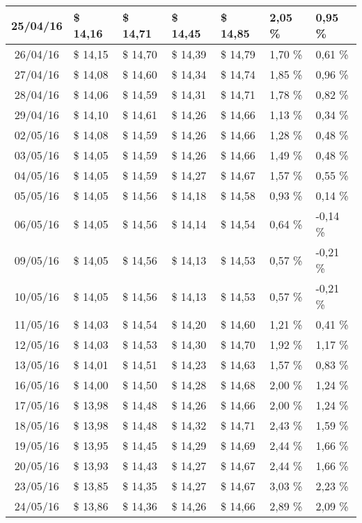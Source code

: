 \begin{center}
\begin{longtable}{|c|p{1.5cm}|p{1.5cm}|p{1.5cm}|p{1.5cm}|p{1.5cm}|p{1.5cm}|}
25/04/16 & \$ 14,16 & \$ 14,71 & \$ 14,45 & \$ 14,85 & 2,05 \% & 0,95 \% \\ \hline
26/04/16 & \$ 14,15 & \$ 14,70 & \$ 14,39 & \$ 14,79 & 1,70 \% & 0,61 \% \\ \hline
27/04/16 & \$ 14,08 & \$ 14,60 & \$ 14,34 & \$ 14,74 & 1,85 \% & 0,96 \% \\ \hline
28/04/16 & \$ 14,06 & \$ 14,59 & \$ 14,31 & \$ 14,71 & 1,78 \% & 0,82 \% \\ \hline
29/04/16 & \$ 14,10 & \$ 14,61 & \$ 14,26 & \$ 14,66 & 1,13 \% & 0,34 \% \\ \hline
02/05/16 & \$ 14,08 & \$ 14,59 & \$ 14,26 & \$ 14,66 & 1,28 \% & 0,48 \% \\ \hline
03/05/16 & \$ 14,05 & \$ 14,59 & \$ 14,26 & \$ 14,66 & 1,49 \% & 0,48 \% \\ \hline
04/05/16 & \$ 14,05 & \$ 14,59 & \$ 14,27 & \$ 14,67 & 1,57 \% & 0,55 \% \\ \hline
05/05/16 & \$ 14,05 & \$ 14,56 & \$ 14,18 & \$ 14,58 & 0,93 \% & 0,14 \% \\ \hline
06/05/16 & \$ 14,05 & \$ 14,56 & \$ 14,14 & \$ 14,54 & 0,64 \% & -0,14 \% \\ \hline
09/05/16 & \$ 14,05 & \$ 14,56 & \$ 14,13 & \$ 14,53 & 0,57 \% & -0,21 \% \\ \hline
10/05/16 & \$ 14,05 & \$ 14,56 & \$ 14,13 & \$ 14,53 & 0,57 \% & -0,21 \% \\ \hline
11/05/16 & \$ 14,03 & \$ 14,54 & \$ 14,20 & \$ 14,60 & 1,21 \% & 0,41 \% \\ \hline
12/05/16 & \$ 14,03 & \$ 14,53 & \$ 14,30 & \$ 14,70 & 1,92 \% & 1,17 \% \\ \hline
13/05/16 & \$ 14,01 & \$ 14,51 & \$ 14,23 & \$ 14,63 & 1,57 \% & 0,83 \% \\ \hline
16/05/16 & \$ 14,00 & \$ 14,50 & \$ 14,28 & \$ 14,68 & 2,00 \% & 1,24 \% \\ \hline
17/05/16 & \$ 13,98 & \$ 14,48 & \$ 14,26 & \$ 14,66 & 2,00 \% & 1,24 \% \\ \hline
18/05/16 & \$ 13,98 & \$ 14,48 & \$ 14,32 & \$ 14,71 & 2,43 \% & 1,59 \% \\ \hline
19/05/16 & \$ 13,95 & \$ 14,45 & \$ 14,29 & \$ 14,69 & 2,44 \% & 1,66 \% \\ \hline
20/05/16 & \$ 13,93 & \$ 14,43 & \$ 14,27 & \$ 14,67 & 2,44 \% & 1,66 \% \\ \hline
23/05/16 & \$ 13,85 & \$ 14,35 & \$ 14,27 & \$ 14,67 & 3,03 \% & 2,23 \% \\ \hline
24/05/16 & \$ 13,86 & \$ 14,36 & \$ 14,26 & \$ 14,66 & 2,89 \% & 2,09 \% \\ \hline

\end{longtable}
\end{center}
